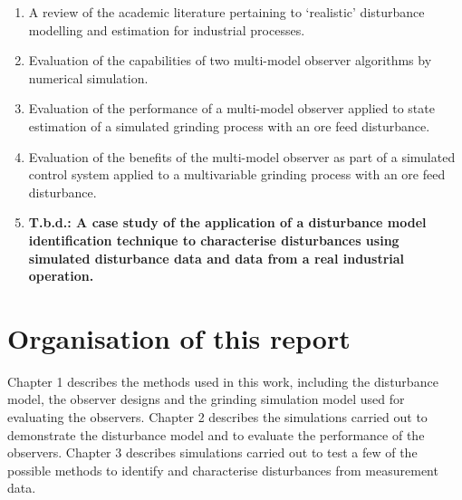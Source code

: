 \begin{enumerate}
	\item A review of the academic literature pertaining to `realistic' disturbance modelling and estimation for industrial processes.
	\item Evaluation of the capabilities of two multi-model observer algorithms by numerical simulation.
	\item Evaluation of the performance of a multi-model observer applied to state estimation of a simulated grinding process with an ore feed disturbance.
	\item Evaluation of the benefits of the multi-model observer as part of a simulated control system applied to a multivariable grinding process with an ore feed disturbance.
	\item \textbf{T.b.d.: A case study of the application of a disturbance model identification technique to characterise disturbances using simulated disturbance data and data from a real industrial operation.}
\end{enumerate}

\section*{Organisation of this report}

Chapter 1 describes the methods used in this work, including the disturbance model, the observer designs and the grinding simulation model used for evaluating the observers.  Chapter 2 describes the simulations carried out to demonstrate the disturbance model and to evaluate the performance of the observers. Chapter 3 describes simulations carried out to test a few of the possible methods to identify and characterise disturbances from measurement data.

